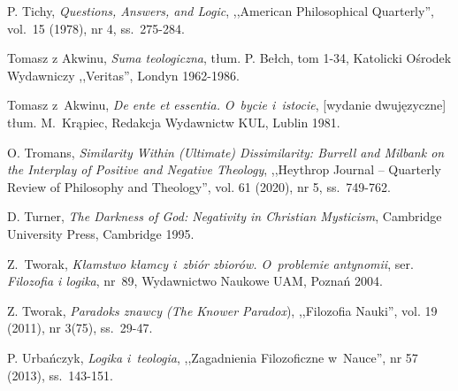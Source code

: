 \begin{thebibliography}{100}
P. Tichy, \textit{Questions, Answers, and Logic}, ,,American Philosophical Quarterly'', vol.~15 (1978), nr 4, ss.~275-284.



Tomasz z Akwinu, \textit{Suma teologiczna}, tłum. P. Bełch, tom 1-34, Katolicki Ośrodek Wydawniczy ,,Veritas'', Londyn 1962-1986.

Tomasz z~Akwinu, \textit{De ente et essentia.} \textit{O~bycie i~istocie}, [wydanie dwujęzyczne] tłum. M.~Krąpiec, Redakcja Wydawnictw KUL, Lublin 1981.


O. Tromans, \textit{Similarity Within (Ultimate) Dissimilarity: Burrell and Milbank on the Interplay of Positive and Negative Theology},
,,Heythrop Journal -- Quarterly Review of Philosophy and Theology'', vol. 61 (2020), nr 5, ss.~749-762.

D. Turner, \textit{The Darkness of God: Negativity in Christian Mysticism}, Cambridge University Press, Cambridge 1995.


Z.~Tworak, \textit{Kłamstwo kłamcy i~zbiór zbiorów. O~problemie antynomii}, ser. \textit{Filozofia i logika}, nr~89, Wydawnictwo Naukowe UAM, Poznań 2004.

Z. Tworak, \textit{Paradoks znawcy (The Knower Paradox}), ,,Filozofia Nauki'', vol. 19 (2011), nr 3(75), ss.~29-47.

P. Urbańczyk, \textit{Logika i~teologia}, ,,Zagadnienia Filozoficzne w~Nauce'', nr 57 (2013), ss.~143-151.


\end{thebibliography}
